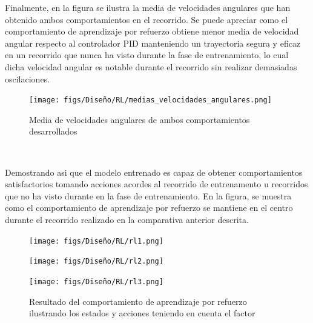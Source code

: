 Finalmente, en la figura se ilustra la media de velocidades angulares que han obtenido ambos comportamientos en el recorrido. Se puede apreciar 
como el comportamiento de aprendizaje por refuerzo obtiene menor media de velocidad angular respecto al controlador PID manteniendo un trayectoria segura y eficaz en un recorrido 
que nunca ha visto durante la fase de entrenamiento, lo cual dicha velocidad angular es notable durante el recorrido sin realizar demasiadas
oscilaciones. 

\begin{figure} [H]
  \begin{center}
    \texttt{[image: figs/Diseño/RL/medias\_velocidades\_angulares.png]}
  \end{center}
  \caption{Media de velocidades angulares de ambos comportamientos desarrollados}
  \label{fig:media_velocidades}
\end{figure}\

Demostrando asi que el modelo entrenado es capaz de obtener comportamientos satisfactorios tomando acciones acordes
al recorrido de entrenamento u recorridos que no ha visto durante en la fase de entrenamiento. En la figura, se muestra como el comportamiento de aprendizaje 
por refuerzo se mantiene en el centro durante el recorrido realizado en la comparativa anterior descrita. 

\begin{figure}[H]
  \centering
  \begin{minipage}{0.3\textwidth}
    \texttt{[image: figs/Diseño/RL/rl1.png]}
  \end{minipage}
  \hfill
  \begin{minipage}{0.3\textwidth}
    \texttt{[image: figs/Diseño/RL/rl2.png]}
  \end{minipage}
  \hfill
  \begin{minipage}{0.3\textwidth}
    \texttt{[image: figs/Diseño/RL/rl3.png]}
  \end{minipage}
  \caption{Resultado del comportamiento de aprendizaje por refuerzo ilustrando los estados y acciones teniendo en cuenta el factor}
  \label{fig:comparativa}
\end{figure}














        


  

